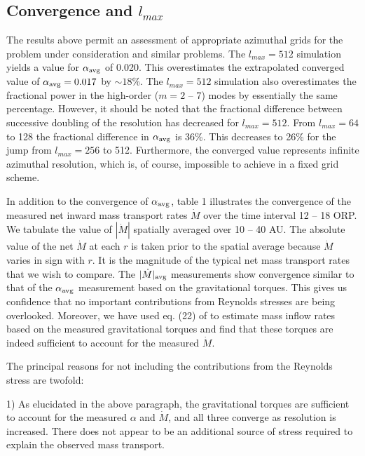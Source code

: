 \documentclass[manuscript]{aastex}
\begin{document}
\subsection{Convergence and $l_{max}$}\label{sec:converge}

The results above permit an assessment of appropriate azimuthal grids for the problem under consideration and
similar problems. The $l_{max} = 512$ simulation yields a value for $\alpha_{\rm avg}$ of 0.020. This
overestimates the extrapolated converged value of $\alpha_{\rm avg} = 0.017$ by $\sim 18$\%. The $l_{max} = 512$
simulation also overestimates the fractional power in the high-order ($m = 2$ -- 7) modes by essentially the
same percentage. However, it should be noted that the fractional difference between successive doubling of the
resolution has decreased for $l_{max} = 512$. From $l_{max} =64$ to 128 the fractional difference in
$\alpha_{\rm avg}$ is 36\%. This decreases to 26\% for the jump from $l_{max} = 256$ to 512. Furthermore, the
converged value represents infinite azimuthal resolution, which is, of course, impossible to achieve in a
fixed grid scheme.

In addition to the convergence of $\alpha_{\rm avg}$, table 1 illustrates the convergence of the measured net
inward mass transport rates $\dot{M}$ over the time interval 12 -- 18 ORP. We tabulate the value of
$|\dot{M}|$ spatially averaged over 10 -- 40 AU. The absolute value of the net $\dot{M}$ at each $r$ is taken
prior to the spatial average because $\dot{M}$ varies in sign with $r$. It is the magnitude of the typical net
mass transport rates that we wish to compare. The $|\dot{M}|_{\rm avg}$ measurements show convergence similar to
that of the $\alpha_{\rm avg}$ measurement based on the gravitational torques. This gives us confidence that no
important contributions from Reynolds stresses are being overlooked. Moreover, we have used eq. (22) of
\citet{boley2006} to estimate mass inflow rates based on the measured gravitational torques and find that
these torques are indeed sufficient to account for the measured $\dot{M}$.

The principal reasons for not including the contributions from the Reynolds stress are twofold:

1) As
elucidated in the above paragraph, the gravitational torques are sufficient to account for the measured
$\alpha$ and $\dot{M}$, and all three converge as resolution is increased. There does not appear to be an
additional source of stress required to explain the observed mass transport.
\end{document}
